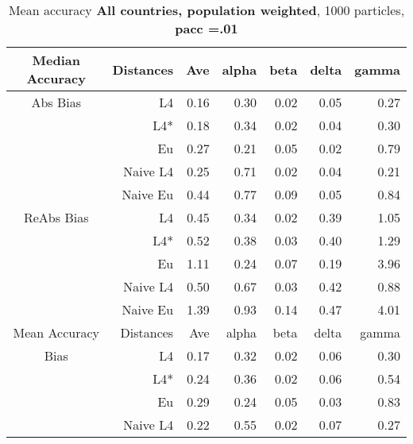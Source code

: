 \documentclass[a4paper,12pt,twoside]{book}
\begin{document}
\begin{table}[H]

\centering
\vfill
\vspace{2cm}
\caption{Mean  accuracy \textbf{All countries, population weighted}, 1000 particles, \textbf{pacc =.01}}


\begin{tabular}{crrrrrr}

  \hline
  
{\color{blue}Median Accuracy} & Distances & Ave & alpha & beta & delta & gamma \\ 
  \hline
{\color{blue}Abs Bias} & L4  &0.16 & 0.30 & 0.02 & 0.05 & 0.27 \\ 
  
&L4*  & 0.18 & 0.34 & 0.02 & 0.04 & 0.30 \\ 
  
&Eu &   0.27 & 0.21 & 0.05 & 0.02 & 0.79 \\ 
   
&Naive L4&      
 0.25 & 0.71 & 0.02 & 0.04 & 0.21 \\
&Naive Eu & 0.44 & 0.77 & 0.09 & 0.05 & 0.84 \\ 
  
   \hline
   
{\color{blue} ReAbs Bias } & L4  &0.45 & 0.34 & 0.02 & 0.39 & 1.05 \\ 
  
&L4*  &0.52 & 0.38 & 0.03 & 0.40 & 1.29 \\ 
  
&Eu &   
 1.11 & 0.24 & 0.07 & 0.19 & 3.96 \\ 
 
  
&Naive L4&  0.50 & 0.67 & 0.03 & 0.42 & 0.88 \\ 
&Naive Eu &    1.39 & 0.93 & 0.14 & 0.47 & 4.01 \\ 
  
   \hline
{\color{blue}Mean Accuracy} & Distances & Ave & alpha & beta & delta & gamma \\ 
  \hline
{\color{blue}Bias} & L4  &0.17 & 0.32 & 0.02 & 0.06 & 0.30 \\ 
   
&L4*  &0.24 & 0.36 & 0.02 & 0.06 & 0.54 \\ 
  
  
&Eu &    0.29 & 0.24 & 0.05 & 0.03 & 0.83 \\ 
 
  
&Naive L4&  
   
 0.22 & 0.55 & 0.02 & 0.07 & 0.27 \\ 
   

\end{tabular}
\end{table}
\end{document}
